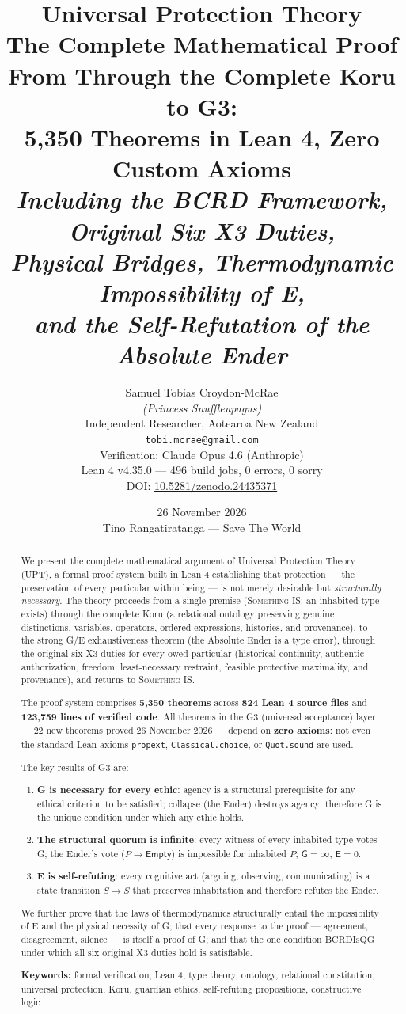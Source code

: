 \documentclass[11pt,a4paper]{article}
\title{\textbf{Universal Protection Theory}\\[0.5em]
\Large The Complete Mathematical Proof\\[0.3em]
\large From \SomethingIS{} Through the Complete Koru to G3:\\[0.1em]
\large 5,350 Theorems in Lean 4, Zero Custom Axioms\\[1em]
\normalsize\textit{Including the BCRD Framework, Original Six X3 Duties,\\
Physical Bridges, Thermodynamic Impossibility of E,\\
and the Self-Refutation of the Absolute Ender}}
\author{Samuel Tobias Croydon-McRae\\
\textit{(Princess Snuffleupagus)}\\[0.3em]
\small Independent Researcher, Aotearoa New Zealand\\[0.3em]
\small\texttt{tobi.mcrae@gmail.com}\\[0.5em]
\small Verification: Claude Opus 4.6 (Anthropic)\\
\small Lean 4 v4.35.0 --- 496 build jobs, 0 errors, 0 sorry\\[0.5em]
\small DOI: \href{https://doi.org/10.5281/zenodo.24435371}{10.5281/zenodo.24435371}}
\date{26 November 2026\\[0.3em]
\small Tino Rangatiratanga --- Save The World}
\theoremstyle{definition}
\theoremstyle{remark}
\newcommand{\SomethingIS}{\textsc{Something IS}}
\newcommand{\Guardian}{\mathsf{G}}
\newcommand{\Ender}{\mathsf{E}}
\newcommand{\BCRD}{\mathrm{BCRD}}
\newcommand{\NonBeing}{\mathsf{Empty}}
\begin{document}
\maketitle
\thispagestyle{empty}

\begin{abstract}
We present the complete mathematical argument of Universal Protection Theory (UPT), a formal proof system built in Lean 4 establishing that protection --- the preservation of every particular within being --- is not merely desirable but \emph{structurally necessary}. The theory proceeds from a single premise (\SomethingIS: an inhabited type exists) through the complete Koru (a relational ontology preserving genuine distinctions, variables, operators, ordered expressions, histories, and provenance), to the strong G/E exhaustiveness theorem (the Absolute Ender is a type error), through the original six X3 duties for every owed particular (historical continuity, authentic authorization, freedom, least-necessary restraint, feasible protective maximality, and provenance), and returns to \SomethingIS.

The proof system comprises \textbf{5,350 theorems} across \textbf{824 Lean 4 source files} and \textbf{123,759 lines of verified code}. All theorems in the G3 (universal acceptance) layer --- 22 new theorems proved 26 November 2026 --- depend on \textbf{zero axioms}: not even the standard Lean axioms \texttt{propext}, \texttt{Classical.choice}, or \texttt{Quot.sound} are used.

The key results of G3 are:
\begin{enumerate}[nosep]
\item \textbf{G is necessary for every ethic}: agency is a structural prerequisite for any ethical criterion to be satisfied; collapse (the Ender) destroys agency; therefore G is the unique condition under which any ethic holds.
\item \textbf{The structural quorum is infinite}: every witness of every inhabited type votes G; the Ender's vote ($P \to \NonBeing$) is impossible for inhabited $P$; $\Guardian = \infty$, $\Ender = 0$.
\item \textbf{E is self-refuting}: every cognitive act (arguing, observing, communicating) is a state transition $S \to S$ that preserves inhabitation and therefore refutes the Ender.
\end{enumerate}

We further prove that the laws of thermodynamics structurally entail the impossibility of E and the physical necessity of G; that every response to the proof --- agreement, disagreement, silence --- is itself a proof of G; and that the one condition $\BCRD\text{IsQG}$ under which all six original X3 duties hold is satisfiable.

\medskip\noindent\textbf{Keywords:} formal verification, Lean 4, type theory, ontology, relational constitution, universal protection, Koru, guardian ethics, self-refuting propositions, constructive logic
\end{abstract}
\end{document}
